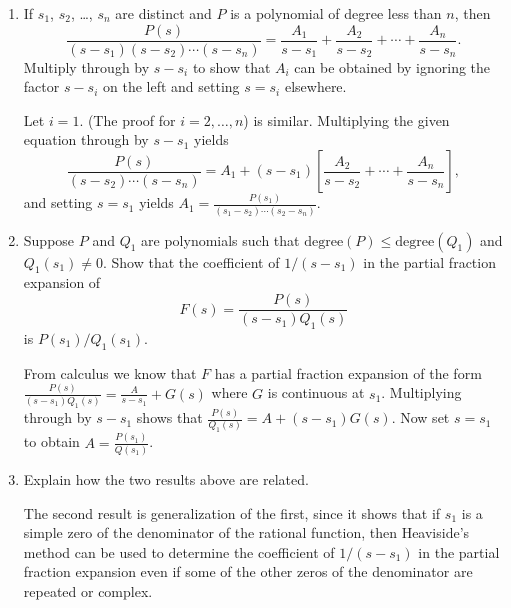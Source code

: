 \documentclass{ximera}
\begin{document}
\begin{problem}\label{exer:8.2.10}
\begin{enumerate}
\item  %
If $s_1$, $s_2$, \dots, $s_n$ are distinct and $P$ is a polynomial of
degree less than $n$, then
$$
\frac{P(s)}{(s-s_1)(s-s_2)\cdots(s-s_n)}=
\frac{A_1}{s-s_1}+\frac{A_2}{s-s_2}+\cdots+\frac{A_n}{s-s_n}.
$$
Multiply through by $s-s_i$ to show that
 $A_i$ can be obtained by ignoring the factor $s-s_i$ on the
left and setting $s=s_i$ elsewhere.

\begin{solution}
Let $i=1$. (The proof for $i=2,\dots,n$) is similar.
Multiplying the given equation through by $s-s_1$ yields
$$
\frac{P(s)}{(s-s_2)\cdots(s-s_n)}=
A_1+(s-s_1)\left[\frac{A_2}{s-s_2}+\cdots+\frac{A_n}{s-s_n}\right],
$$
and setting $s=s_1$ yields
$A_1=\frac{P(s_1)}{(s_1-s_2)\cdots(s_2-s_n)}$.
\end{solution}

\item %
Suppose $P$ and $Q_1$ are polynomials such that
$\text{degree}(P)\le\text{degree}(Q_1)$ and $Q_1(s_1)\ne0$.
Show that the coefficient of $1/(s-s_1)$ in the partial fraction expansion of
$$
F(s)=\frac{P(s)}{(s-s_1)Q_1(s)}
$$
is $P(s_1)/Q_1(s_1)$.

\begin{solution}
From calculus we know that $F$  has a partial
fraction expansion of the form
$\frac{P(s)}{(s-s_1)Q_1(s)}=\frac{A}{s-s_1}+G(s)$ where $G$ is
continuous at $s_1$. Multiplying through by $s-s_1$ shows that
$\frac{P(s)}{Q_1(s)}=A+(s-s_1)G(s)$. Now set $s=s_1$ to obtain
$A=\frac{P(s_1)}{Q(s_1)}$.
\end{solution}

\item %
Explain how the two results above are related.

\begin{solution}
The second result is generalization of the first, since it shows that if $s_1$ is a simple zero
of the denominator of the rational function, then Heaviside's
method can be used to determine the coefficient of $1/(s-s_1)$
in the partial fraction expansion even if some of the other zeros
of the denominator are repeated or complex.
\end{solution}
\end{enumerate}
\end{problem}
\end{document}

